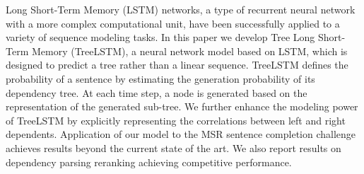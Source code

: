 Long Short-Term Memory (LSTM) networks, a type of recurrent neural network with a more complex computational unit, have been successfully applied to a variety of sequence modeling tasks. In this paper we develop Tree Long Short-Term Memory (TreeLSTM), a neural network model based on LSTM, which is designed to predict a tree rather than a linear sequence. TreeLSTM defines the probability of a sentence by estimating the generation probability of its dependency tree. At each time step, a node is generated based on the representation of the generated sub-tree. We further enhance the modeling power of TreeLSTM by explicitly representing the correlations between left and right dependents. Application of our model to the MSR sentence completion challenge achieves results beyond the current state of the art. We also report results on dependency parsing reranking achieving competitive performance.
